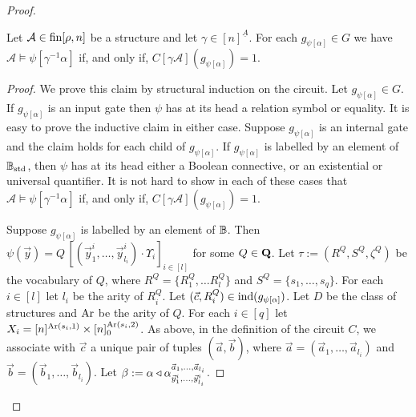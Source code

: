 \documentclass[../main/thesis.tex]{subfiles}
\begin{document}
\begin{proof}
\begin{claim}
  Let $\mathcal{A} \in \text{\upshape fin}{[\rho, n]}$ be a structure and let $\gamma \in
  [n]^{\underline{A}}$. For each $g_{\psi[\alpha]} \in G$ we have $\mathcal{A}
  \models \psi[\gamma^{-1}\alpha]$ if, and only if, $C[\gamma
  \mathcal{A}](g_{\psi[\alpha]}) = 1$.
\end{claim}
\begin{proof}
  We prove this claim by structural induction on the circuit. Let
  $g_{\psi[\alpha]} \in G$. If $g_{\psi[\alpha]}$ is an input gate then $\psi$
  has at its head a relation symbol or equality. It is easy to prove the
  inductive claim in either case. Suppose $g_{\psi[\alpha]}$ is an internal gate
  and the claim holds for each child of $g_{\psi[\alpha]}$. If
  $g_{\psi[\alpha]}$ is labelled by an element of $\mathbb{B}_{\text{std}}$, then $\psi$ has at its
  head either a Boolean connective, or an existential or universal quantifier.
  It is not hard to show in each of these cases that $\mathcal{A} \models
  \psi[\gamma^{-1}\alpha]$ if, and only if, $C[\gamma
  \mathcal{A}](g_{\psi[\alpha]}) = 1$.

  Suppose $g_{\psi[\alpha]}$ is labelled by an element of $\mathbb{B}$. Then $\psi
  (\vec{y}) = Q \, [(\vec{y}^i_1, \ldots, \vec{y}^i_{l_i}) \cdot \Upsilon_i]_{i
    \in [l]}$ for some $Q \in \mathbf{Q}$. Let $\tau := (R^Q, S^Q, \zeta^Q)$ be
  the vocabulary of $Q$, where $R^{Q} = \{R^{Q}_1, \ldots R^{Q}_l\}$ and $S^Q =
  \{s_1, \ldots, s_q\}$. For each $i \in [l]$ let $l_i$ be the arity of
  $R^{Q}_i$. Let $(\vec{c}, R^Q_i) \in \text{\upshape ind}(g_{\psi[\alpha]})$. Let $D$ be the
  class of structures and $\text{\upshape Ar}$ be the arity of $Q$. For each $i \in [q]$ let
  $X_i = [n]^{\text{\upshape Ar}(s_i, 1)} \times [n]^{\text{\upshape Ar}(s_i, 2)}_0$. As above, in the
  definition of the circuit $C$, we associate with $\vec{c}$ a unique pair of
  tuples $(\vec{a}, \vec{b})$, where $\vec{a} = (\vec{a}_1, \ldots,
  \vec{a}_{l_i})$ and $\vec{b} = (\vec{b}_1, \ldots, \vec{b}_{l_i})$. Let $\beta
  := \alpha \triangleleft\alpha^{\vec{a}_1, \ldots, \vec{a}_{l_i}}_{\vec{y}^i_1,
      \ldots, \vec{y}^i_{l_i}}$.
  

\end{proof}
\end{proof}
\end{document}
